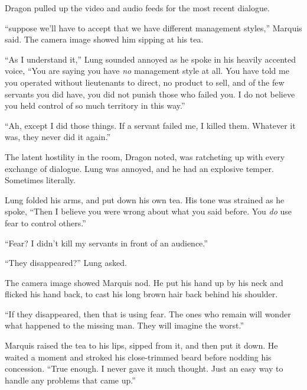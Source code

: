 Dragon pulled up the video and audio feeds for the most recent dialogue.



``\ldotsI suppose we'll have to accept that we have different management styles,'' Marquis said.  The camera image showed him sipping at his tea.



``As I understand it,'' Lung sounded annoyed as he spoke in his heavily accented voice, ``You are saying you have \emph{no} management style at all.  You have told me you operated without lieutenants to direct, no product to sell, and of the few servants you did have, you did not punish those who failed you.  I do not believe you held control of so much territory in this way.''



``Ah, except I did those things.  If a servant failed me, I killed them.  Whatever it was, they never did it again.''



The latent hostility in the room, Dragon noted, was ratcheting up with every exchange of dialogue.  Lung was annoyed, and he had an explosive temper.  Sometimes literally.



Lung folded his arms, and put down his own tea.  His tone was strained as he spoke, ``Then I believe you were wrong about what you said before.  You \emph{do} use fear to control others.''



``Fear?  I didn't kill my servants in front of an audience.''



``They disappeared?'' Lung asked.



The camera image showed Marquis nod.  He put his hand up by his neck and flicked his hand back, to cast his long brown hair back behind his shoulder.



``If they disappeared, then that is using fear.  The ones who remain will wonder what happened to the missing man.  They will imagine the worst.''



Marquis raised the tea to his lips, sipped from it, and then put it down.  He waited a moment and stroked his close-trimmed beard before nodding his concession.  ``True enough.  I never gave it much thought.  Just an easy way to handle any problems that came up.''



